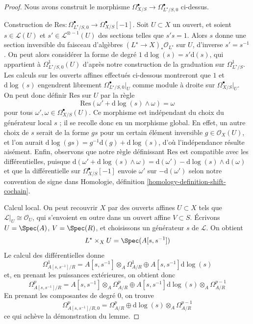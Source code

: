 \begin{proof}
Nous avons construit le morphisme
$\Omega^\bullet_{X/S} \to \Omega^\bullet_{L^\star/S, 0}$ ci-dessus.

\medskip\noindent
Construction de
$\text{Res} : \Omega^\bullet_{L^\star/S, 0} \to \Omega^\bullet_{X/S}[-1]$.
Soit $U \subset X$ un ouvert, et soient $s \in \mathcal{L}(U)$
et $s' \in \mathcal{L}^{\otimes -1}(U)$ des sections telles que
$s' s = 1$. Alors $s$ donne une section inversible du faisceau
d'algèbres $(L^\star \to X)_*\mathcal{O}_{L^\star}$ sur $U$,
d'inverse $s' = s^{-1}$. On peut alors considérer la forme de degré $1$
$\text{d}\log(s) = s' \text{d}(s)$, qui appartient à
$\Omega^1_{L^\star/S, 0}(U)$ d'après notre construction de la graduation sur
$\Omega^1_{L^\star/S}$. Les calculs sur les ouverts affines effectués ci-dessous
montreront que $1$ et $\text{d}\log(s)$ engendrent librement
$\Omega^\bullet_{L^\star/S, 0}|_U$ comme module à droite sur
$\Omega^\bullet_{X/S}|_U$.
On peut donc définir $\text{Res}$ sur $U$ par la règle
$$
\text{Res}(\omega' + \text{d}\log(s) \wedge \omega) = \omega
$$
pour tous $\omega', \omega \in \Omega^\bullet_{X/S}(U)$. Ce
morphisme est indépendant du choix du générateur local $s$ ; il se
recolle donc en un morphisme global. En effet, un autre choix de $s$
serait de la forme $gs$ pour un certain élément inversible $g \in \mathcal{O}_X(U)$,
et l'on aurait $\text{d}\log(gs) = g^{-1}\text{d}(g) + \text{d}\log(s)$,
d'où l'indépendance résulte aisément.
Enfin, observons que notre règle définissant $\text{Res}$
est compatible avec les différentielles,
puisque $\text{d}(\omega' + \text{d}\log(s) \wedge \omega) =
\text{d}(\omega') - \text{d}\log(s) \wedge \text{d}(\omega)$
et que la différentielle sur $\Omega^\bullet_{X/S}[-1]$
envoie $\omega'$ sur $-\text{d}(\omega')$ selon notre convention de signe dans
Homologie, définition \ref{homology-definition-shift-cochain}.

\medskip\noindent
Calcul local. On peut recouvrir $X$ par des ouverts affines $U \subset X$
tels que $\mathcal{L}|_U \cong \mathcal{O}_U$, qui s'envoient en outre
dans un ouvert affine $V \subset S$. Écrivons $U = \Spec(A)$, $V = \Spec(R)$,
et choisissons un générateur $s$ de $\mathcal{L}$. On obtient
$$
L^\star \times_X U = \Spec(A[s, s^{-1}])
$$
Le calcul des différentielles donne
$$
\Omega^1_{A[s, s^{-1}]/R} =
A[s, s^{-1}] \otimes_A \Omega^1_{A/R} \oplus A[s, s^{-1}] \text{d}\log(s)
$$
et, en prenant les puissances extérieures, on obtient donc
$$
\Omega^p_{A[s, s^{-1}]/R} =
A[s, s^{-1}] \otimes_A \Omega^p_{A/R}
\oplus
A[s, s^{-1}] \text{d}\log(s) \otimes_A \Omega^{p - 1}_{A/R}
$$
En prenant les composantes de degré $0$, on trouve
$$
\Omega^p_{A[s, s^{-1}]/R, 0} =
\Omega^p_{A/R} \oplus \text{d}\log(s) \otimes_A \Omega^{p - 1}_{A/R}
$$
ce qui achève la démonstration du lemme.
\end{proof}

